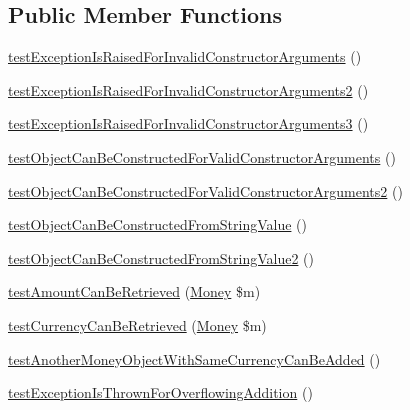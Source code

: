 \subsection*{Public Member Functions}
\begin{DoxyCompactItemize}
\item 
\hyperlink{classSebastianBergmann_1_1Money_1_1MoneyTest_af3f8810ab4101ba75011c09e2025348b}{test\+Exception\+Is\+Raised\+For\+Invalid\+Constructor\+Arguments} ()
\item 
\hyperlink{classSebastianBergmann_1_1Money_1_1MoneyTest_a38d70ad2b86cb6cf8db7b84435a9ddd5}{test\+Exception\+Is\+Raised\+For\+Invalid\+Constructor\+Arguments2} ()
\item 
\hyperlink{classSebastianBergmann_1_1Money_1_1MoneyTest_ae92a249011cd7bb24ad379b7d12a3e44}{test\+Exception\+Is\+Raised\+For\+Invalid\+Constructor\+Arguments3} ()
\item 
\hyperlink{classSebastianBergmann_1_1Money_1_1MoneyTest_a95d785cc53df35fa1a1fbc5863a1ba3b}{test\+Object\+Can\+Be\+Constructed\+For\+Valid\+Constructor\+Arguments} ()
\item 
\hyperlink{classSebastianBergmann_1_1Money_1_1MoneyTest_a2978cfb870796ff8f4ab6c562e940a0d}{test\+Object\+Can\+Be\+Constructed\+For\+Valid\+Constructor\+Arguments2} ()
\item 
\hyperlink{classSebastianBergmann_1_1Money_1_1MoneyTest_a91d9c41f5ec25398b85238698c6e31d4}{test\+Object\+Can\+Be\+Constructed\+From\+String\+Value} ()
\item 
\hyperlink{classSebastianBergmann_1_1Money_1_1MoneyTest_aceae3bde9a59e29c657cf9f6777006d7}{test\+Object\+Can\+Be\+Constructed\+From\+String\+Value2} ()
\item 
\hyperlink{classSebastianBergmann_1_1Money_1_1MoneyTest_a7105012df0ad0bd66cd41660dd1ebac1}{test\+Amount\+Can\+Be\+Retrieved} (\hyperlink{classSebastianBergmann_1_1Money_1_1Money}{Money} \$m)
\item 
\hyperlink{classSebastianBergmann_1_1Money_1_1MoneyTest_a6a45c31204b978067ea5f7d5152cca86}{test\+Currency\+Can\+Be\+Retrieved} (\hyperlink{classSebastianBergmann_1_1Money_1_1Money}{Money} \$m)
\item 
\hyperlink{classSebastianBergmann_1_1Money_1_1MoneyTest_aee738b2b78d1c989f875d202072dfb19}{test\+Another\+Money\+Object\+With\+Same\+Currency\+Can\+Be\+Added} ()
\item 
\hyperlink{classSebastianBergmann_1_1Money_1_1MoneyTest_aef95eb7c630ab1fbc672d0af37bf1627}{test\+Exception\+Is\+Thrown\+For\+Overflowing\+Addition} ()

\end{DoxyCompactItemize}
